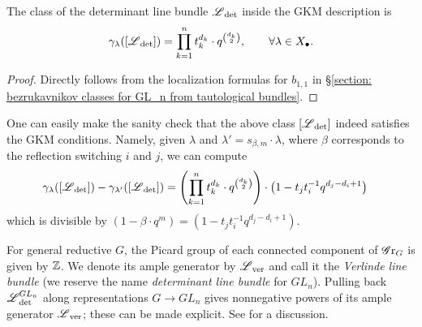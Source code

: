  
\begin{claim}\label{equation: localization of determinant line bundle in GLn} \label{claim: localization of determinant line bundle in GLn}
The class of the determinant line bundle $\operatorname{\mathscr{L}}_{\det}$ inside the GKM description is
\begin{equation*}
   \gamma_{\lambda}( [\operatorname{\mathscr{L}}_{\det}] ) = \prod_{k=1}^n t^{d_k}_k \cdot q^{\binom{d_k}{2}}, \qquad \forall \lambda \in X_{\bullet}.
\end{equation*}
\end{claim}
\begin{proof}
Directly follows from the localization formulas for $b_{1,1}$ in \S \ref{section: bezrukavnikov classes for GL_n from tautological bundles}. 
\end{proof}

\begin{remark}
    One can easily make the sanity check that the above class $[\operatorname{\mathscr{L}}_{\det}]$ indeed satisfies the GKM conditions. Namely, given $\lambda$ and $\lambda' = s_{\beta, m}\cdot \lambda$, where $\beta$ corresponds to the reflection switching $i$ and $j$, we can compute
    \begin{align*}
       \gamma_{\lambda}( [\operatorname{\mathscr{L}}_{\det}]) - \gamma_{\lambda'}( [\operatorname{\mathscr{L}}_{\det}] ) 
       &= \left( \prod_{k=1}^n t^{d_k}_k \cdot q^{\binom{d_k}{2}} \right) \cdot \left( 1 - t_jt_i^{-1} q^{d_j -d_i +1} \right)
    \end{align*}
 which is divisible by $(1 - {\beta} \cdot q^{m}) = (1 - t_jt_i^{-1} q^{d_j -d_i +1})$.   
\end{remark}


\begin{remark}
For general reductive $G$, the Picard group of each connected component of $\operatorname{\mathscr{G}r}_G$ is given by $\operatorname{\mathbb{Z}}$. We denote its ample generator by $\operatorname{\mathscr{L}}_{\mathrm{ver}}$ and call it the \emph{Verlinde line bundle} (we reserve the name \emph{determinant line bundle} for $GL_n$). Pulling back $\operatorname{\mathscr{L}}^{GL_n}_{\det}$ along representations $G \to GL_n$ gives nonnegative powers of its ample generator $\operatorname{\mathscr{L}}_{\mathrm{ver}}$; these can be made explicit. See \cite[Lemma 4.2, Remark 4.3]{YZ09} for a discussion.  
\end{remark}

